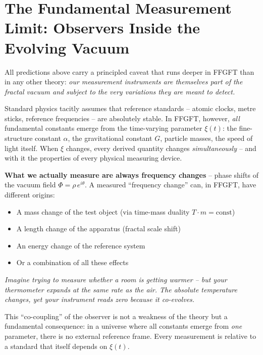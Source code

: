 	\section{The Fundamental Measurement Limit: Observers Inside the Evolving Vacuum}
	
	All predictions above carry a principled caveat that runs deeper in FFGFT than in any other theory: \textit{our measurement instruments are themselves part of the fractal vacuum and subject to the very variations they are meant to detect.}
	
	Standard physics tacitly assumes that reference standards -- atomic clocks, metre sticks, reference frequencies -- are absolutely stable. In FFGFT, however, \textit{all} fundamental constants emerge from the time-varying parameter $\xi(t)$: the fine-structure constant $\alpha$, the gravitational constant $G$, particle masses, the speed of light itself. When $\xi$ changes, every derived quantity changes \textit{simultaneously} -- and with it the properties of every physical measuring device.
	
	\textbf{What we actually measure are always frequency changes} -- phase shifts of the vacuum field $\Phi = \rho\, e^{i\theta}$. A measured ``frequency change'' can, in FFGFT, have different origins:
	\begin{itemize}[leftmargin=*]
		\item A mass change of the test object (via time-mass duality $T \cdot m = \text{const}$)
		\item A length change of the apparatus (fractal scale shift)
		\item An energy change of the reference system
		\item Or a combination of all these effects
	\end{itemize}
	
	\textit{Imagine trying to measure whether a room is getting warmer -- but your thermometer expands at the same rate as the air. The absolute temperature changes, yet your instrument reads zero because it co-evolves.}
	
	This ``co-coupling'' of the observer is not a weakness of the theory but a fundamental consequence: in a universe where all constants emerge from \textit{one} parameter, there is no external reference frame. Every measurement is relative to a standard that itself depends on $\xi(t)$.
	
